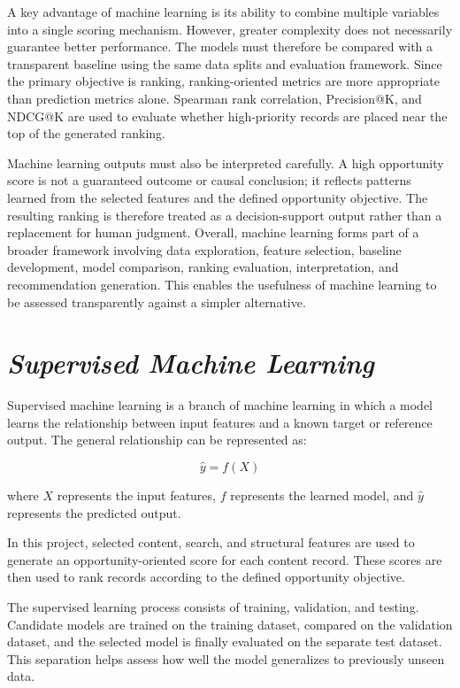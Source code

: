 \documentclass[12pt,a4paper]{report}
\begin{document}
A key advantage of machine learning is its ability to combine multiple variables into a single scoring mechanism. However, greater complexity does not necessarily guarantee better performance. The models must therefore be compared with a transparent baseline using the same data splits and evaluation framework. Since the primary objective is ranking, ranking-oriented metrics are more appropriate than prediction metrics alone. Spearman rank correlation, Precision@K, and NDCG@K are used to evaluate whether high-priority records are placed near the top of the generated ranking.

Machine learning outputs must also be interpreted carefully. A high opportunity score is not a guaranteed outcome or causal conclusion; it reflects patterns learned from the selected features and the defined opportunity objective. The resulting ranking is therefore treated as a decision-support output rather than a replacement for human judgment. Overall, machine learning forms part of a broader framework involving data exploration, feature selection, baseline development, model comparison, ranking evaluation, interpretation, and recommendation generation. This enables the usefulness of machine learning to be assessed transparently against a simpler alternative.

\section{\textit{Supervised Machine Learning}}
Supervised machine learning is a branch of machine learning in which a model learns the relationship between input features and a known target or reference output. The general relationship can be represented as:

\begin{equation}
\hat{y} = f(X)
\end{equation}

where $X$ represents the input features, $f$ represents the learned model, and $\hat{y}$ represents the predicted output.

In this project, selected content, search, and structural features are used to generate an opportunity-oriented score for each content record. These scores are then used to rank records according to the defined opportunity objective.

The supervised learning process consists of training, validation, and testing. Candidate models are trained on the training dataset, compared on the validation dataset, and the selected model is finally evaluated on the separate test dataset. This separation helps assess how well the model generalizes to previously unseen data.
\end{document}
